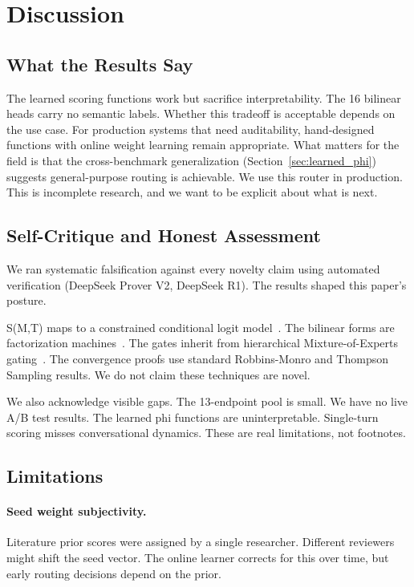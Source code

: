 \section{Discussion}
\label{sec:discussion}

\subsection{What the Results Say}

The learned scoring functions work but sacrifice interpretability. The 16 bilinear heads carry no semantic labels. Whether this tradeoff is acceptable depends on the use case. For production systems that need auditability, hand-designed functions with online weight learning remain appropriate. What matters for the field is that the cross-benchmark generalization (Section~\ref{sec:learned_phi}) suggests general-purpose routing is achievable. We use this router in production. This is incomplete research, and we want to be explicit about what is next.

\subsection{Self-Critique and Honest Assessment}

We ran systematic falsification against every novelty claim using automated verification (DeepSeek Prover V2, DeepSeek R1). The results shaped this paper's posture.

S(M,T) maps to a constrained conditional logit model~\citep{mcfadden1974conditional}. The bilinear forms are factorization machines~\citep{rendle2010factorization}. The gates inherit from hierarchical Mixture-of-Experts gating~\citep{jordan1994hierarchical}. The convergence proofs use standard Robbins-Monro and Thompson Sampling results. We do not claim these techniques are novel.

We also acknowledge visible gaps. The 13-endpoint pool is small. We have no live A/B test results. The learned phi functions are uninterpretable. Single-turn scoring misses conversational dynamics. These are real limitations, not footnotes.

\subsection{Limitations}

\paragraph{Seed weight subjectivity.} Literature prior scores were assigned by a single researcher. Different reviewers might shift the seed vector. The online learner corrects for this over time, but early routing decisions depend on the prior.

